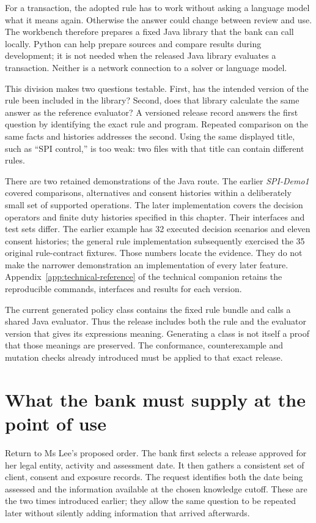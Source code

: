 For a transaction, the adopted rule has to work without asking a language model
what it means again. Otherwise the answer could change between review and use.
The workbench therefore prepares a fixed Java library that the bank can call
locally. Python can help prepare sources and compare results during development;
it is not needed when the released Java library evaluates a transaction. Neither
is a network connection to a solver or language model.

This division makes two questions testable. First, has the intended version of
the rule been included in the library? Second, does that library calculate the
same answer as the reference evaluator? A versioned release record answers the
first question by identifying the exact rule and program. Repeated comparison
on the same facts and histories addresses the second. Using the same displayed
title, such as ``SPI control,'' is too weak: two files with that title can
contain different rules.

There are two retained demonstrations of the Java route. The earlier
\emph{SPI-Demo1} covered comparisons, alternatives and consent histories within
a deliberately small set of supported operations. The later implementation
covers the decision operators and finite duty histories specified in this
chapter. Their interfaces and test sets differ. The earlier example has 32
executed decision scenarios and eleven consent histories; the general rule
implementation subsequently exercised the 35 original rule-contract fixtures.
Those numbers locate the evidence. They do not make the narrower demonstration
an implementation of every later feature. Appendix~\ref{app:technical-reference} of the technical companion
retains the reproducible commands, interfaces and results for each version.

The current generated policy class contains the fixed rule bundle and calls a
shared Java evaluator. Thus the release includes both the rule and the evaluator
version that gives its expressions meaning. Generating a class is not itself a
proof that those meanings are preserved. The conformance, counterexample and
mutation checks already introduced must be applied to that exact release.

\section{What the bank must supply at the point of use}
\label{sec:reader-java-use}

Return to Ms Lee's proposed order. The bank first selects a release approved for
her legal entity, activity and assessment date. It then gathers a consistent set
of client, consent and exposure records. The request identifies both the date
being assessed and the information available at the chosen knowledge cutoff.
These are the two times introduced earlier; they allow the same question to be
repeated later without silently adding information that arrived afterwards.

